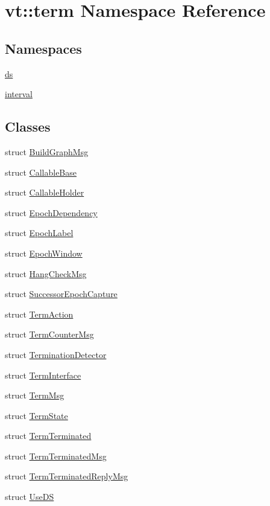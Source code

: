 \hypertarget{namespacevt_1_1term}{}\section{vt\+:\+:term Namespace Reference}
\label{namespacevt_1_1term}
\subsection*{Namespaces}
\begin{DoxyCompactItemize}
\item 
 \hyperlink{namespacevt_1_1term_1_1ds}{ds}
\item 
 \hyperlink{namespacevt_1_1term_1_1interval}{interval}
\end{DoxyCompactItemize}
\subsection*{Classes}
\begin{DoxyCompactItemize}
\item 
struct \hyperlink{structvt_1_1term_1_1_build_graph_msg}{Build\+Graph\+Msg}
\item 
struct \hyperlink{structvt_1_1term_1_1_callable_base}{Callable\+Base}
\item 
struct \hyperlink{structvt_1_1term_1_1_callable_holder}{Callable\+Holder}
\item 
struct \hyperlink{structvt_1_1term_1_1_epoch_dependency}{Epoch\+Dependency}
\item 
struct \hyperlink{structvt_1_1term_1_1_epoch_label}{Epoch\+Label}
\item 
struct \hyperlink{structvt_1_1term_1_1_epoch_window}{Epoch\+Window}
\item 
struct \hyperlink{structvt_1_1term_1_1_hang_check_msg}{Hang\+Check\+Msg}
\item 
struct \hyperlink{structvt_1_1term_1_1_successor_epoch_capture}{Successor\+Epoch\+Capture}
\item 
struct \hyperlink{structvt_1_1term_1_1_term_action}{Term\+Action}
\item 
struct \hyperlink{structvt_1_1term_1_1_term_counter_msg}{Term\+Counter\+Msg}
\item 
struct \hyperlink{structvt_1_1term_1_1_termination_detector}{Termination\+Detector}
\item 
struct \hyperlink{structvt_1_1term_1_1_term_interface}{Term\+Interface}
\item 
struct \hyperlink{structvt_1_1term_1_1_term_msg}{Term\+Msg}
\item 
struct \hyperlink{structvt_1_1term_1_1_term_state}{Term\+State}
\item 
struct \hyperlink{structvt_1_1term_1_1_term_terminated}{Term\+Terminated}
\item 
struct \hyperlink{structvt_1_1term_1_1_term_terminated_msg}{Term\+Terminated\+Msg}
\item 
struct \hyperlink{structvt_1_1term_1_1_term_terminated_reply_msg}{Term\+Terminated\+Reply\+Msg}
\item 
struct \hyperlink{structvt_1_1term_1_1_use_d_s}{Use\+DS}
\end{DoxyCompactItemize}
